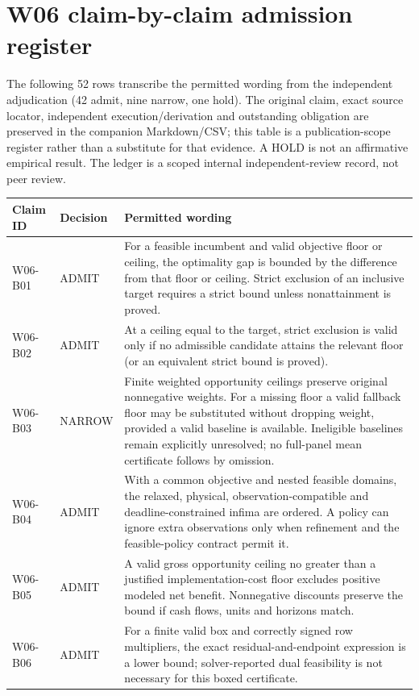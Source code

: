 \documentclass[11pt,letterpaper]{article}
\begin{document}
\endgroup

\section{W06 claim-by-claim admission register}
\label{app:w06claims}
The following 52 rows transcribe the permitted wording from the independent adjudication (42 admit, nine narrow, one hold). The original claim, exact source locator, independent execution/derivation and outstanding obligation are preserved in the companion Markdown/CSV; this table is a publication-scope register rather than a substitute for that evidence. A HOLD is not an affirmative empirical result. The ledger is a scoped internal independent-review record, not peer review.\cite{w06review}
\begingroup\small
\begin{longtable}{P{.12\linewidth}P{.12\linewidth}P{.66\linewidth}}
\toprule Claim ID & Decision & Permitted wording\\\midrule\endhead
W06-B01 & ADMIT & For a feasible incumbent and valid objective floor or ceiling, the optimality gap is bounded by the difference from that floor or ceiling. Strict exclusion of an inclusive target requires a strict bound unless nonattainment is proved.\\
W06-B02 & ADMIT & At a ceiling equal to the target, strict exclusion is valid only if no admissible candidate attains the relevant floor (or an equivalent strict bound is proved).\\
W06-B03 & NARROW & Finite weighted opportunity ceilings preserve original nonnegative weights. For a missing floor a valid fallback floor may be substituted without dropping weight, provided a valid baseline is available. Ineligible baselines remain explicitly unresolved; no full-panel mean certificate follows by omission.\\
W06-B04 & ADMIT & With a common objective and nested feasible domains, the relaxed, physical, observation-compatible and deadline-constrained infima are ordered. A policy can ignore extra observations only when refinement and the feasible-policy contract permit it.\\
W06-B05 & ADMIT & A valid gross opportunity ceiling no greater than a justified implementation-cost floor excludes positive modeled net benefit. Nonnegative discounts preserve the bound if cash flows, units and horizons match.\\
W06-B06 & ADMIT & For a finite valid box and correctly signed row multipliers, the exact residual-and-endpoint expression is a lower bound; solver-reported dual feasibility is not necessary for this boxed certificate.\\

\end{longtable}
\end{document}
